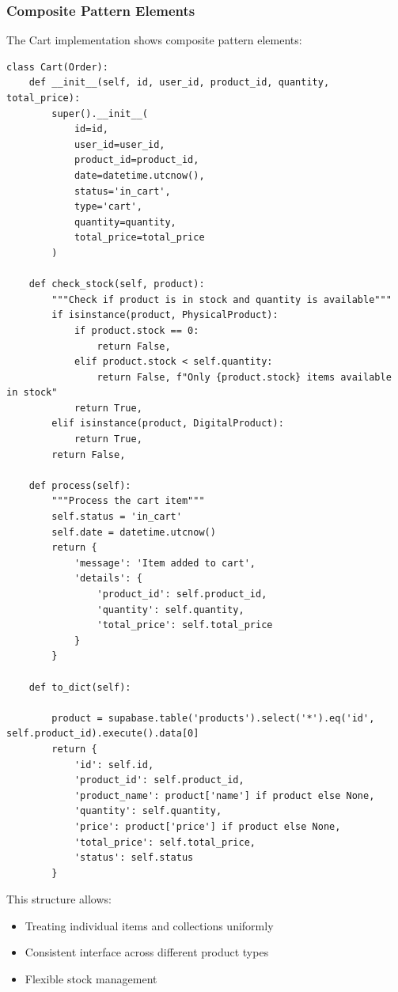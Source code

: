 \documentclass[12pt,a4paper]{article}
\begin{document}
\subsubsection{Composite Pattern Elements}
The Cart implementation shows composite pattern elements:
\begin{verbatim}
class Cart(Order):
    def __init__(self, id, user_id, product_id, quantity, total_price):
        super().__init__(
            id=id,
            user_id=user_id,
            product_id=product_id,
            date=datetime.utcnow(),
            status='in_cart',
            type='cart',
            quantity=quantity,
            total_price=total_price
        )

    def check_stock(self, product):
        """Check if product is in stock and quantity is available"""
        if isinstance(product, PhysicalProduct):
            if product.stock == 0:
                return False, 
            elif product.stock < self.quantity:
                return False, f"Only {product.stock} items available in stock"
            return True, 
        elif isinstance(product, DigitalProduct):
            return True, 
        return False,

    def process(self):
        """Process the cart item"""
        self.status = 'in_cart'
        self.date = datetime.utcnow()
        return {
            'message': 'Item added to cart',
            'details': {
                'product_id': self.product_id,
                'quantity': self.quantity,
                'total_price': self.total_price
            }
        }

    def to_dict(self):
        
        product = supabase.table('products').select('*').eq('id', self.product_id).execute().data[0]
        return {
            'id': self.id,
            'product_id': self.product_id,
            'product_name': product['name'] if product else None,
            'quantity': self.quantity,
            'price': product['price'] if product else None,
            'total_price': self.total_price,
            'status': self.status
        }
    \end{verbatim}
This structure allows:
\begin{itemize}
    \item Treating individual items and collections uniformly
    \item Consistent interface across different product types
    \item Flexible stock management
\end{itemize}
\end{document}
